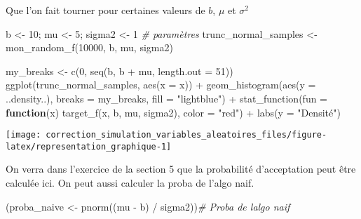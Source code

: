 \documentclass[
]{article}
\newenvironment{Shaded}{\begin{snugshade}}{\end{snugshade}}
\newcommand{\AttributeTok}[1]{\textcolor[rgb]{0.77,0.63,0.00}{#1}}
\newcommand{\CommentTok}[1]{\textcolor[rgb]{0.56,0.35,0.01}{\textit{#1}}}
\newcommand{\ControlFlowTok}[1]{\textcolor[rgb]{0.13,0.29,0.53}{\textbf{#1}}}
\newcommand{\DecValTok}[1]{\textcolor[rgb]{0.00,0.00,0.81}{#1}}
\newcommand{\FunctionTok}[1]{\textcolor[rgb]{0.00,0.00,0.00}{#1}}
\newcommand{\NormalTok}[1]{#1}
\newcommand{\OtherTok}[1]{\textcolor[rgb]{0.56,0.35,0.01}{#1}}
\newcommand{\SpecialCharTok}[1]{\textcolor[rgb]{0.00,0.00,0.00}{#1}}
\newcommand{\StringTok}[1]{\textcolor[rgb]{0.31,0.60,0.02}{#1}}
\newenvironment{Correction}%
  { \vspace{\baselineskip}\begin{mdframed}[backgroundcolor=my_green]}%
  {\end{mdframed}}
\begin{document}
\begin{Correction}
Que l'on fait tourner pour certaines valeurs de $b$, $\mu$ et $\sigma^2$
\end{Correction}

\begin{Shaded}
\begin{Highlighting}[]
\NormalTok{b }\OtherTok{\textless{}{-}} \DecValTok{10}\NormalTok{; mu }\OtherTok{\textless{}{-}} \DecValTok{5}\NormalTok{; sigma2 }\OtherTok{\textless{}{-}} \DecValTok{1} \CommentTok{\# paramètres}
\NormalTok{trunc\_normal\_samples }\OtherTok{\textless{}{-}} \FunctionTok{mon\_random\_f}\NormalTok{(}\DecValTok{10000}\NormalTok{, b, mu, sigma2)}
\end{Highlighting}
\end{Shaded}

\begin{Shaded}
\begin{Highlighting}[]
\NormalTok{my\_breaks }\OtherTok{\textless{}{-}} \FunctionTok{c}\NormalTok{(}\DecValTok{0}\NormalTok{, }\FunctionTok{seq}\NormalTok{(b, b }\SpecialCharTok{+}\NormalTok{ mu, }\AttributeTok{length.out =} \DecValTok{51}\NormalTok{))}
\FunctionTok{ggplot}\NormalTok{(trunc\_normal\_samples, }\FunctionTok{aes}\NormalTok{(}\AttributeTok{x =}\NormalTok{ x)) }\SpecialCharTok{+}
  \FunctionTok{geom\_histogram}\NormalTok{(}\FunctionTok{aes}\NormalTok{(}\AttributeTok{y =}\NormalTok{ ..density..), }\AttributeTok{breaks =}\NormalTok{ my\_breaks,}
                 \AttributeTok{fill =} \StringTok{"lightblue"}\NormalTok{) }\SpecialCharTok{+}
  \FunctionTok{stat\_function}\NormalTok{(}\AttributeTok{fun =} \ControlFlowTok{function}\NormalTok{(x) }\FunctionTok{target\_f}\NormalTok{(x, b, mu, sigma2), }\AttributeTok{color =} \StringTok{"red"}\NormalTok{) }\SpecialCharTok{+}
  \FunctionTok{labs}\NormalTok{(}\AttributeTok{y =} \StringTok{"Densité"}\NormalTok{)}
\end{Highlighting}
\end{Shaded}

\begin{center}\texttt{[image: correction\_simulation\_variables\_aleatoires\_files/figure-latex/representation\_graphique-1]} \end{center}

On verra dans l'exercice de la section 5 que la probabilité
d'acceptation peut être calculée ici. On peut aussi calculer la proba de
l'algo naif.

\begin{Shaded}
\begin{Highlighting}[]
\NormalTok{(proba\_naive }\OtherTok{\textless{}{-}} \FunctionTok{pnorm}\NormalTok{((mu }\SpecialCharTok{{-}}\NormalTok{ b) }\SpecialCharTok{/}\NormalTok{ sigma2))}\CommentTok{\# Proba de l\textquotesingle{}algo naif}
\end{Highlighting}
\end{Shaded}
\end{document}
